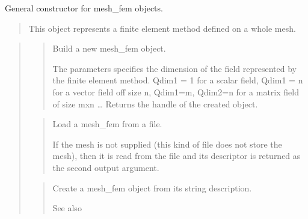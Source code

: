 \documentclass[a4paper,11pt,english]{sphinxmanual}
\begin{document}
\sphinxAtStartPar
{}

\sphinxAtStartPar
General constructor for mesh\_fem objects.
\begin{quote}

\sphinxAtStartPar
This object represents a finite element method defined on a whole mesh.
\end{quote}

\sphinxAtStartPar
{}
\begin{quote}

\sphinxAtStartPar
{}
\begin{quote}

\sphinxAtStartPar
Build a new mesh\_fem object.

\sphinxAtStartPar
The  parameters specifies the dimension of the field represented
by the finite element method. Qdim1 = 1 for a scalar field,
Qdim1 = n for a vector field off size n, Qdim1=m, Qdim2=n for
a matrix field of size mxn …
Returns the handle of the created object.
\end{quote}

\sphinxAtStartPar
{}
\begin{quote}

\sphinxAtStartPar
Load a mesh\_fem from a file.

\sphinxAtStartPar
If the mesh  is not supplied (this kind of file does not store the
mesh), then it is read from the file  and its descriptor is
returned as the second output argument.
\end{quote}

\sphinxAtStartPar
{}
\begin{quote}

\sphinxAtStartPar
Create a mesh\_fem object from its string description.

\sphinxAtStartPar
See also 
\end{quote}

\sphinxAtStartPar
{}
\begin{quote}


\end{quote}
\end{quote}
\end{document}
